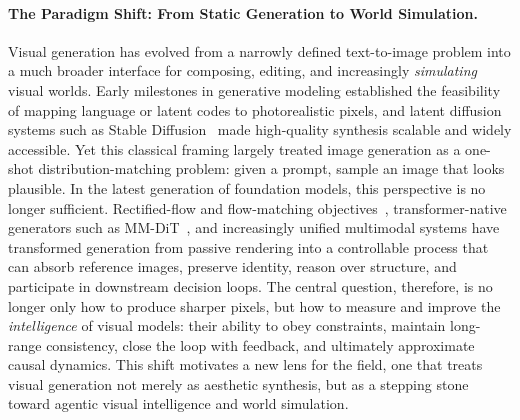 \documentclass{llmxive}
\begin{document}
\vspace{1em}
\vspace{-0.4em}

\paragraph{The Paradigm Shift: From Static Generation to World Simulation.}
Visual generation has evolved from a narrowly defined text-to-image problem into a much broader interface for composing, editing, and increasingly \emph{simulating} visual worlds. Early milestones in generative modeling established the feasibility of mapping language or latent codes to photorealistic pixels, and latent diffusion systems such as Stable Diffusion~\citep{rombach2022stablediffusion} made high-quality synthesis scalable and widely accessible. Yet this classical framing largely treated image generation as a one-shot distribution-matching problem: given a prompt, sample an image that looks plausible. In the latest generation of foundation models, this perspective is no longer sufficient. Rectified-flow and flow-matching objectives~\citep{liu2022flow,lipman2023flowmatchinggenerativemodeling}, transformer-native generators such as MM-DiT~\citep{esser2024stablediffusion3}, and increasingly unified multimodal systems have transformed generation from passive rendering into a controllable process that can absorb reference images, preserve identity, reason over structure, and participate in downstream decision loops. The central question, therefore, is no longer only how to produce sharper pixels, but how to measure and improve the \emph{intelligence} of visual models: their ability to obey constraints, maintain long-range consistency, close the loop with feedback, and ultimately approximate causal dynamics. This shift motivates a new lens for the field, one that treats visual generation not merely as aesthetic synthesis, but as a stepping stone toward agentic visual intelligence and world simulation.
\end{document}
